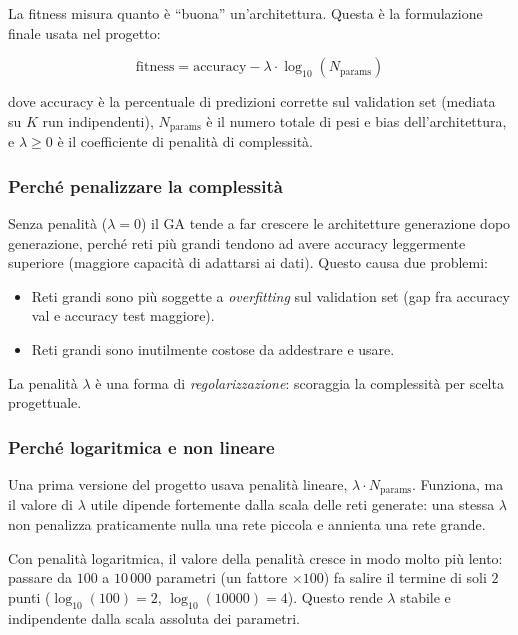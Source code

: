 \documentclass[11pt,a4paper]{article}
\begin{document}
La fitness misura quanto è ``buona'' un'architettura. Questa è la
formulazione finale usata nel progetto:

\begin{equation}
    \text{fitness} = \text{accuracy} - \lambda \cdot \log_{10}(N_{\text{params}})
\end{equation}

dove $\text{accuracy}$ è la percentuale di predizioni corrette sul
validation set (mediata su $K$ run indipendenti), $N_{\text{params}}$ è
il numero totale di pesi e bias dell'architettura, e $\lambda \geq 0$ è
il coefficiente di penalità di complessità.

\subsubsection{Perché penalizzare la complessità}

Senza penalità ($\lambda = 0$) il GA tende a far crescere le architetture
generazione dopo generazione, perché reti più grandi tendono ad avere
accuracy leggermente superiore (maggiore capacità di adattarsi ai dati).
Questo causa due problemi:
\begin{itemize}
    \item Reti grandi sono più soggette a \emph{overfitting} sul validation
          set (gap fra accuracy val e accuracy test maggiore).
    \item Reti grandi sono inutilmente costose da addestrare e usare.
\end{itemize}
La penalità $\lambda$ è una forma di \emph{regolarizzazione}: scoraggia la
complessità per scelta progettuale.

\subsubsection{Perché logaritmica e non lineare}

Una prima versione del progetto usava penalità lineare, $\lambda \cdot
N_{\text{params}}$. Funziona, ma il valore di $\lambda$ utile dipende
fortemente dalla scala delle reti generate: una stessa $\lambda$ non
penalizza praticamente nulla una rete piccola e annienta una rete grande.

Con penalità logaritmica, il valore della penalità cresce in modo molto
più lento: passare da $100$ a $10\,000$ parametri (un fattore $\times 100$)
fa salire il termine di soli $2$ punti ($\log_{10}(100)=2$,
$\log_{10}(10000)=4$). Questo rende $\lambda$ stabile e indipendente
dalla scala assoluta dei parametri.
\end{document}
